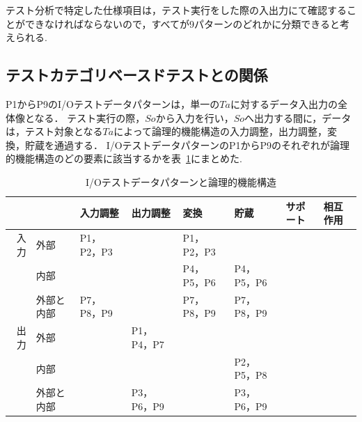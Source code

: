 テスト分析で特定した仕様項目は，テスト実行をした際の入出力にて確認することができなければならないので，すべてが9パターンのどれかに分類できると考えられる.

\subsection{テストカテゴリベースドテストとの関係}

P1からP9のI/Oテストデータパターンは，単一の$Ta$に対するデータ入出力の全体像となる．
テスト実行の際，$So$から入力を行い，$So$へ出力する間に，データは，テスト対象となる$Ta$によって論理的機能構造の入力調整，出力調整，変換，貯蔵を通過する．
I/OテストデータパターンのP1からP9のそれぞれが論理的機能構造のどの要素に該当するかを表~\ref{tab:D-4-tab1}にまとめた.

\begin{table}[htbp]
  \centering
  \caption{I/Oテストデータパターンと論理的機能構造}
    \begin{tabular}{|r|p{3em}|l|l|l|p{4em}|l|l|}
    \hline
          & \multicolumn{1}{l|}{} & \multicolumn{1}{p{4em}|}{入力調整} & \multicolumn{1}{p{4em}|}{出力調整} & \multicolumn{1}{p{2em}|}{変換} & 貯蔵 & \multicolumn{1}{p{4em}|}{サポート} & \multicolumn{1}{p{4em}|}{相互作用} \bigstrut\\
    \hline
    \hline
    \multicolumn{1}{|p{1.5em}|}{入力} & 外部 & \multicolumn{1}{p{4em}|}{P1，P2，P3} &       & \multicolumn{1}{p{4em}|}{P1，P2，P3} & \multicolumn{1}{l|}{} &       &  \bigstrut\\
\cline{2-8}          & 内部 &       &       & \multicolumn{1}{p{4em}|}{P4，P5，P6} & P4，P5，P6 &       &  \bigstrut\\
\cline{2-8}          & 外部と内部 & \multicolumn{1}{p{4em}|}{P7，P8，P9} &       & \multicolumn{1}{p{4em}|}{P7，P8，P9} & P7，P8，P9 &       &  \bigstrut\\
    \hline
    \multicolumn{1}{|p{1.5em}|}{出力} & 外部 &       & \multicolumn{1}{p{4em}|}{P1，P4，P7} &       & \multicolumn{1}{l|}{} &       &  \bigstrut\\
\cline{2-8}          & 内部 &       &       &       & \multicolumn{1}{p{4em}|}{P2，P5，P8} &       &  \bigstrut\\
\cline{2-8}          & 外部と内部 &       & \multicolumn{1}{p{4em}|}{P3，P6，P9} &       & \multicolumn{1}{p{4em}|}{P3，P6，P9} &       &  \bigstrut\\
    \hline
    \end{tabular}%
  \label{tab:D-4-tab1}%
\end{table}%


